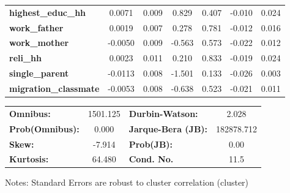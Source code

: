 \begin{center}
\begin{tabular}{lcccccc}
\textbf{highest\_educ\_hh}    &       0.0071  &        0.009     &     0.829  &         0.407        &       -0.010    &        0.024     \\
\textbf{work\_father}         &       0.0019  &        0.007     &     0.278  &         0.781        &       -0.012    &        0.016     \\
\textbf{work\_mother}         &      -0.0050  &        0.009     &    -0.563  &         0.573        &       -0.022    &        0.012     \\
\textbf{reli\_hh}             &       0.0023  &        0.011     &     0.210  &         0.833        &       -0.019    &        0.024     \\
\textbf{single\_parent}       &      -0.0113  &        0.008     &    -1.501  &         0.133        &       -0.026    &        0.003     \\
\textbf{migration\_classmate} &      -0.0053  &        0.008     &    -0.638  &         0.523        &       -0.021    &        0.011     \\
\bottomrule
\end{tabular}
\begin{tabular}{lclc}
\textbf{Omnibus:}       & 1501.125 & \textbf{  Durbin-Watson:     } &     2.028   \\
\textbf{Prob(Omnibus):} &   0.000  & \textbf{  Jarque-Bera (JB):  } & 182878.712  \\
\textbf{Skew:}          &  -7.914  & \textbf{  Prob(JB):          } &      0.00   \\
\textbf{Kurtosis:}      &  64.480  & \textbf{  Cond. No.          } &      11.5   \\
\bottomrule
\end{tabular}
\end{center}

Notes: \newline
 [1] Standard Errors are robust to cluster correlation (cluster)